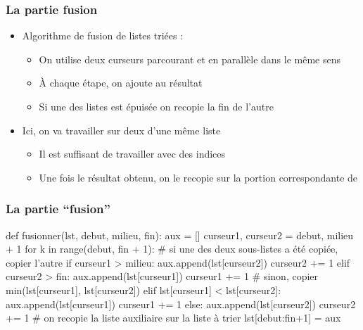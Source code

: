 \documentclass[12pt]{linfo-beamer}
\begin{document}
\begin{frame}
\frametitle{La partie fusion}

\begin{itemize}
    \item Algorithme de fusion de listes triées :
\begin{itemize}
    \item On utilise deux curseurs parcourant
       et  en parallèle dans le même sens
    \item À chaque étape, on ajoute  au
      résultat
    \item Si une des listes est épuisée on recopie la fin de l'autre
\end{itemize}

\medskip

\item Ici, on va travailler sur deux  d'une
  même liste 
  \begin{itemize}
  \item Il est suffisant de travailler avec des indices
  \item Une fois le résultat obtenu, on le recopie sur la portion
    correspondante de 
  \end{itemize}
\end{itemize}



\end{frame}


\begin{frame}[fragile]
\frametitle{La partie ``fusion''}

\scriptsize
\begin{pyframe}{}
def fusionner(lst, debut, milieu, fin):
    aux = []
    curseur1, curseur2 = debut, milieu + 1
    for k in range(debut, fin + 1):
        # si une des deux sous-listes a été copiée, copier l'autre
        if curseur1 > milieu:
            aux.append(lst[curseur2])
            curseur2 += 1
        elif curseur2 > fin:
            aux.append(lst[curseur1])
            curseur1 += 1
        # sinon, copier min(lst[curseur1], lst[curseur2])
        elif lst[curseur1] < lst[curseur2]:
            aux.append(lst[curseur1])
            curseur1 += 1
        else:
            aux.append(lst[curseur2])
            curseur2 += 1
    # on recopie la liste auxiliaire sur la liste à trier
    lst[debut:fin+1] = aux
\end{pyframe}
\end{frame}
\end{document}
